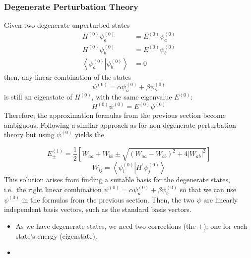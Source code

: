 \subsubsection{Degenerate Perturbation Theory}
Given two degenerate unperturbed states
\begin{align*}
    H^{(0)}\psi_a^{(0)}                                            & =E^{(0)}\psi_a^{(0)} \\
    H^{(0)}\psi_b^{(0)}                                            & =E^{(0)}\psi_b^{(0)} \\
    \left\langle\psi_a^{(0)}\right|\left.\psi_b^{(0)}\right\rangle & =0
\end{align*}
then, any linear combination of the states
\begin{equation*}
    \psi^{(0)}=\alpha\psi_a^{(0)}+\beta\psi_b^{(0)}
\end{equation*}
is still an eigenstate of $H^{(0)}$, with the same eigenvalue $E^{(0)}$:
\begin{equation*}
    H^{(0)}\psi^{(0)}=E^{(0)}\psi^{(0)}
\end{equation*}
Therefore, the approximation formulas from the previous section become ambiguous. Following a similar approach as for non-degenerate perturbation theory but using $\psi^{(0)}$ yields the

\newpar{}

\begin{equation*}
    E_{\pm}^{(1)}=\frac{1}{2}\left[W_{aa}+W_{bb}\pm\sqrt{{(W_{aa}-W_{bb})}^{2}+4 |W_{ab}|^{2}}\right]
\end{equation*}
\begin{equation*}
    W_{ij}=\left\langle\psi_{i}^{(0)} \right| H^{\prime} \left.\psi_{j}^{(0)}\right\rangle
\end{equation*}
This solution arises from finding a suitable basis for the degenerate states, i.e.\ the right linear combination $\psi^{(0)}=\alpha\psi_a^{(0)}+\beta\psi_b^{(0)}$ so that we can use $\psi^{(0)}$ in the formulas from the previous section. Then, the two $\psi$ are linearly independent basis vectors, such as the standard basis vectors.

\newpar{}
\begin{itemize}
    \item As we have degenerate states, we need two corrections (the $\pm$): one for each state's energy (eigenstate).
    \item 
\end{itemize}

